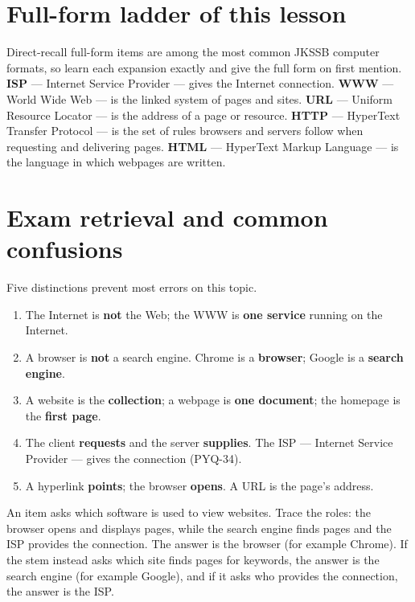 \section{Full-form ladder of this lesson}
Direct-recall full-form items are among the most common JKSSB computer
formats, so learn each expansion exactly and give the full form on first
mention. \textbf{ISP} --- Internet Service Provider --- gives the Internet
connection. \textbf{WWW} --- World Wide Web --- is the linked system of
pages and sites. \textbf{URL} --- Uniform Resource Locator --- is the address
of a page or resource. \textbf{HTTP} --- HyperText Transfer Protocol --- is
the set of rules browsers and servers follow when requesting and delivering
pages. \textbf{HTML} --- HyperText Markup Language --- is the language in
which webpages are written.

\section{Exam retrieval and common confusions}
Five distinctions prevent most errors on this topic.
\begin{enumerate}
  \item The Internet is \textbf{not} the Web; the WWW is \textbf{one
    service} running on the Internet.
  \item A browser is \textbf{not} a search engine. Chrome is a
    \textbf{browser}; Google is a \textbf{search engine}.
  \item A website is the \textbf{collection}; a webpage is \textbf{one
    document}; the homepage is the \textbf{first page}.
  \item The client \textbf{requests} and the server \textbf{supplies}. The
    ISP --- Internet Service Provider --- gives the connection (PYQ-34).
  \item A hyperlink \textbf{points}; the browser \textbf{opens}. A URL is the
    page's address.
\end{enumerate}

\begin{example}
An item asks which software is used to view websites. Trace the roles: the
browser opens and displays pages, while the search engine finds pages and
the ISP provides the connection. The answer is the browser (for example
Chrome). If the stem instead asks which site finds pages for keywords, the
answer is the search engine (for example Google), and if it asks who
provides the connection, the answer is the ISP.
\end{example}


